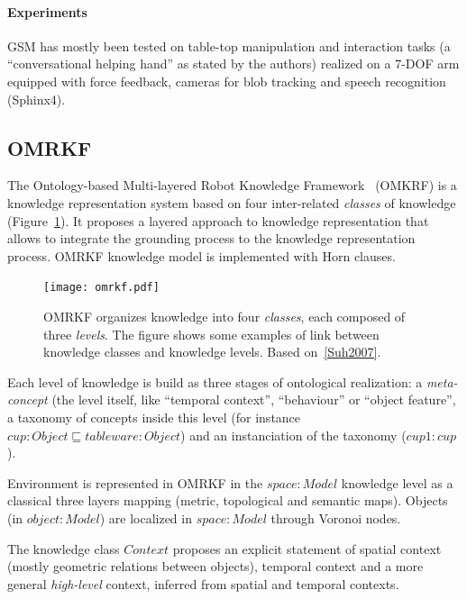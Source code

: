 \documentclass[a4paper, twocolumn]{article}
\begin{document}
\paragraph{Experiments} GSM has mostly been tested on table-top manipulation
and interaction tasks (a ``conversational helping hand'' as stated by the
authors) realized on a 7-DOF arm equipped with force feedback, cameras for blob
tracking and speech recognition (Sphinx4).

\subsection{OMRKF}
\label{sect|omrkf}

The Ontology-based Multi-layered Robot Knowledge Framework~\cite{Suh2007}
(OMKRF) is a knowledge representation system based on four inter-related
\emph{classes} of knowledge (Figure~\ref{fig|omrkf}). It proposes a layered
approach to knowledge representation that allows to integrate the grounding
process to the knowledge representation process. OMRKF knowledge model is
implemented with Horn clauses.

\begin{figure}
    \centering
    \texttt{[image: omrkf.pdf]}

    \caption{OMRKF organizes knowledge into four \emph{classes}, each composed
    of three \emph{levels}. The figure shows some examples of link between
    knowledge classes and knowledge levels. Based on~\ref{Suh2007}.}

    \label{fig|omrkf}
\end{figure}

Each level of knowledge is build as three stages of ontological realization: a
\emph{meta-concept} (the level itself, like ``temporal context'', ``behaviour''
or ``object feature'', a taxonomy of concepts inside this level (for instance
$cup : Object \sqsubseteq tableware : Object$) and an instanciation of the
taxonomy ($cup1 : cup$).

Environment is represented in OMRKF in the $space : Model$ knowledge level as a
classical three layers mapping (metric, topological and semantic maps). Objects
(in $object : Model$) are localized in $space : Model$ through Voronoi nodes.

The knowledge class $Context$ proposes an explicit statement of spatial context
(mostly geometric relations between objects), temporal context and a more
general \emph{high-level} context, inferred from spatial and temporal contexts.
\end{document}
